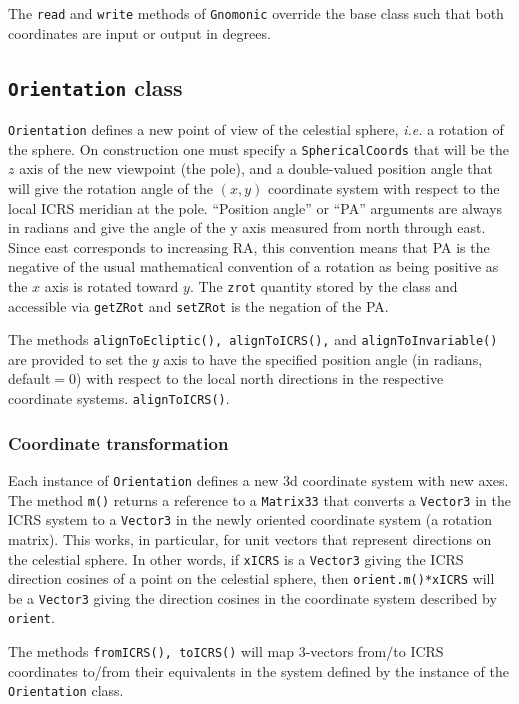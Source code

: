 \documentclass[11pt,preprint,flushrt]{aastex}
\begin{document}
The {\tt read} and {\tt write} methods of {\tt Gnomonic} override the base class such that both coordinates are input or output in degrees.

\subsection{{\tt Orientation} class}
{\tt Orientation} defines a new point of view of the celestial sphere, {\it i.e.} a rotation of the sphere.  On construction one must specify a {\tt SphericalCoords} that will be the $z$ axis of the new viewpoint (the pole), and a double-valued position angle that will give the rotation angle of the $(x,y)$ coordinate system with respect to the local ICRS meridian at the pole.  ``Position angle'' or ``PA'' arguments are always in radians and give the angle of the y axis measured from north through east.  Since east corresponds to increasing RA, this convention means that PA is the negative of the usual mathematical convention of a rotation as being positive as the $x$ axis is rotated toward $y$.  The {\tt zrot} quantity stored by the class and accessible via {\tt getZRot} and {\tt setZRot} is the negation of the PA.

The methods {\tt alignToEcliptic(), alignToICRS(),} and {\tt alignToInvariable()} are provided to set the $y$ axis to have the specified position angle (in radians, default$=0$) with respect to the local north directions in the respective coordinate systems.  {\tt alignToICRS()}.

\subsubsection{Coordinate transformation}
Each instance of {\tt Orientation} defines a new 3d coordinate system with new axes.  The method {\tt m()} returns a reference to a {\tt Matrix33} that converts a {\tt Vector3} in the ICRS system to a {\tt Vector3} in the newly oriented coordinate system (a rotation matrix).  This works, in particular, for unit vectors that represent directions on the celestial sphere.  In other words, if {\tt xICRS} is a {\tt Vector3} giving the ICRS direction cosines of a point on the celestial sphere, then {\tt orient.m()*xICRS} will be a {\tt Vector3} giving the direction cosines in the coordinate system described by {\tt orient}.

The methods {\tt fromICRS(), toICRS()} will map 3-vectors from/to ICRS coordinates to/from their equivalents in the system defined by the instance of the {\tt Orientation} class.
\end{document}
